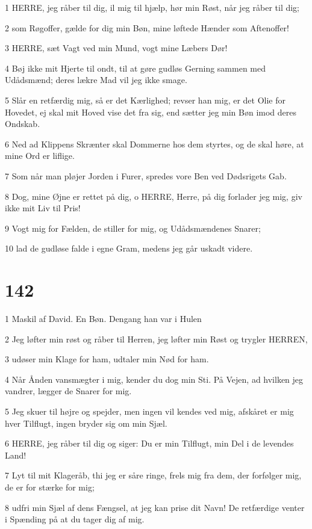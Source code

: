 \par 1 HERRE, jeg råber til dig, il mig til hjælp, hør min Røst, når jeg råber til dig;
\par 2 som Røgoffer, gælde for dig min Bøn, mine løftede Hænder som Aftenoffer!
\par 3 HERRE, sæt Vagt ved min Mund, vogt mine Læbers Dør!
\par 4 Bøj ikke mit Hjerte til ondt, til at gøre gudløs Gerning sammen med Udådsmænd; deres lækre Mad vil jeg ikke smage.
\par 5 Slår en retfærdig mig, så er det Kærlighed; revser han mig, er det Olie for Hovedet, ej skal mit Hoved vise det fra sig, end sætter jeg min Bøn imod deres Ondskab.
\par 6 Ned ad Klippens Skrænter skal Dommerne hos dem styrtes, og de skal høre, at mine Ord er liflige.
\par 7 Som når man pløjer Jorden i Furer, spredes vore Ben ved Dødsrigets Gab.
\par 8 Dog, mine Øjne er rettet på dig, o HERRE, Herre, på dig forlader jeg mig, giv ikke mit Liv til Pris!
\par 9 Vogt mig for Fælden, de stiller for mig, og Udådsmændenes Snarer;
\par 10 lad de gudløse falde i egne Gram, medens jeg går uskadt videre.

\chapter{142}

\par 1 Maskil af David. En Bøn. Dengang han var i Hulen
\par 2 Jeg løfter min røst og råber til Herren, jeg løfter min Røst og trygler HERREN,
\par 3 udøser min Klage for ham, udtaler min Nød for ham.
\par 4 Når Ånden vansmægter i mig, kender du dog min Sti. På Vejen, ad hvilken jeg vandrer, lægger de Snarer for mig.
\par 5 Jeg skuer til højre og spejder, men ingen vil kendes ved mig, afskåret er mig hver Tilflugt, ingen bryder sig om min Sjæl.
\par 6 HERRE, jeg råber til dig og siger: Du er min Tilflugt, min Del i de levendes Land!
\par 7 Lyt til mit Klageråb, thi jeg er såre ringe, frels mig fra dem, der forfølger mig, de er for stærke for mig;
\par 8 udfri min Sjæl af dens Fængsel, at jeg kan prise dit Navn! De retfærdige venter i Spænding på at du tager dig af mig.

